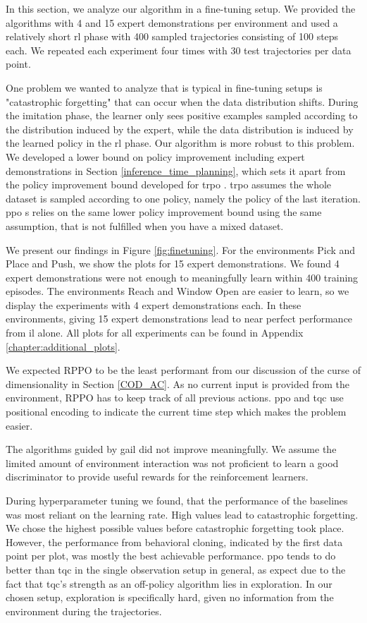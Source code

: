 In this section, we analyze our algorithm in a fine-tuning setup. We provided the algorithms with 4 and 15 expert demonstrations per 
environment and used a relatively short \ac{rl} phase with 400 sampled trajectories consisting of 100 steps each. We 
repeated each experiment four times with 30 test trajectories per data point.

One problem we wanted to analyze that is typical in fine-tuning setups 
is "catastrophic forgetting" 
that can occur when the data distribution shifts. During the imitation phase, the learner only sees positive examples sampled according to 
the distribution induced by the expert, while the data distribution is induced by the learned policy in the \ac{rl} phase.
Our algorithm is more robust to this problem. We developed a lower bound on policy improvement including expert demonstrations in Section \ref{inference_time_planning}, which sets it 
apart from the policy improvement bound developed for \ac{trpo} \cite{TRPO}. \ac{trpo} assumes the whole dataset is sampled according to one policy, namely the policy of the last iteration. 
\ac{ppo} \cite{PPO}s relies on the same lower policy improvement bound using the same assumption, that is not fulfilled when you have a mixed dataset. 


We present our findings in Figure \ref{fig:finetuning}. 
For the environments Pick and Place and Push, we show the plots for 15 expert demonstrations. We found 4 expert demonstrations were not 
enough to meaningfully learn within 400 training episodes. The environments Reach and Window Open are easier to learn, so we display the 
experiments with 4 expert demonstrations each. In these environments, giving 15 expert demonstrations lead to near perfect performance from \ac{il} alone. 
All plots for all experiments can be found in Appendix \ref{chapter:additional_plots}.

We expected RPPO to be the least performant from our discussion of the curse of dimensionality in Section \ref{COD_AC}. As no current input 
is provided from the environment, RPPO has to keep track of all previous actions. \ac{ppo} and \ac{tqc} use positional encoding to indicate the current 
time step which makes the problem easier.

The algorithms guided by \ac{gail} did not improve meaningfully. We assume the limited amount of environment 
interaction was not proficient to learn a good discriminator to provide useful rewards for the reinforcement learners. 

During hyperparameter tuning we found, that the performance of the baselines was most 
reliant on the learning rate. High values lead to catastrophic forgetting. We chose the highest possible values before 
catastrophic forgetting took place. However, the performance from behavioral cloning, indicated by the first data point per plot, was mostly 
the best achievable performance. \ac{ppo} tends to do better than \ac{tqc} in the single observation setup in general, as expect due to the 
fact that \ac{tqc}'s strength as an off-policy algorithm lies in exploration. In our chosen setup, exploration is specifically hard, given no 
information from the environment during the trajectories.

